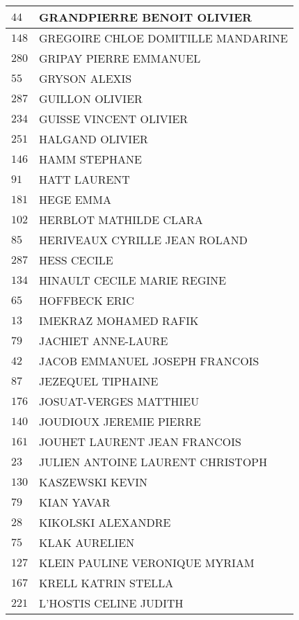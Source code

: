 \begin{xltabular}{\linewidth}{|l|X|}
    \hline
    $44$ & GRANDPIERRE BENOIT OLIVIER \\
    \hline
    $148$ & GREGOIRE CHLOE DOMITILLE MANDARINE \\
    \hline
    $280$ & GRIPAY PIERRE EMMANUEL \\
    \hline
    $55$ & GRYSON ALEXIS \\
    \hline
    $287$ & GUILLON OLIVIER \\
    \hline
    $234$ & GUISSE VINCENT OLIVIER \\
    \hline
    $251$ & HALGAND OLIVIER \\
    \hline
    $146$ & HAMM STEPHANE \\
    \hline
    $91$ & HATT LAURENT \\
    \hline
    $181$ & HEGE EMMA \\
    \hline
    $102$ & HERBLOT MATHILDE CLARA \\
    \hline
    $85$ & HERIVEAUX CYRILLE JEAN ROLAND \\
    \hline
    $287$ & HESS CECILE \\
    \hline
    $134$ & HINAULT CECILE MARIE REGINE \\
    \hline
    $65$ & HOFFBECK ERIC \\
    \hline
    $13$ & IMEKRAZ MOHAMED RAFIK \\
    \hline
    $79$ & JACHIET ANNE-LAURE \\
    \hline
    $42$ & JACOB EMMANUEL JOSEPH FRANCOIS \\
    \hline
    $87$ & JEZEQUEL TIPHAINE \\
    \hline
    $176$ & JOSUAT-VERGES MATTHIEU \\
    \hline
    $140$ & JOUDIOUX JEREMIE PIERRE \\
    \hline
    $161$ & JOUHET LAURENT JEAN FRANCOIS \\
    \hline
    $23$ & JULIEN ANTOINE LAURENT CHRISTOPH \\
    \hline
    $130$ & KASZEWSKI KEVIN \\
    \hline
    $79$ & KIAN YAVAR \\
    \hline
    $28$ & KIKOLSKI ALEXANDRE \\
    \hline
    $75$ & KLAK AURELIEN \\
    \hline
    $127$ & KLEIN PAULINE VERONIQUE MYRIAM \\
    \hline
    $167$ & KRELL KATRIN STELLA \\
    \hline
    $221$ & L'HOSTIS CELINE JUDITH \\
    \hline

\end{xltabular}
